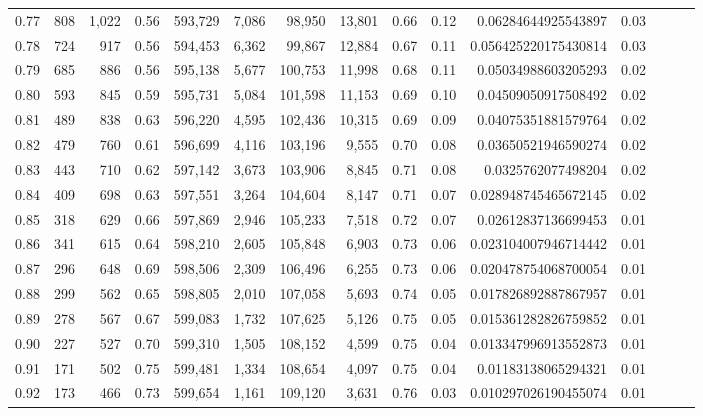 \begin{tabular}{rrrrrrrrrrrrrrr}
0.77 &     808 &  1,022 &  0.56 &  593,729 &    7,086 &   98,950 &   13,801 &  0.66 &  0.12 &    0.06284644925543897 &      0.03 \\
0.78 &     724 &    917 &  0.56 &  594,453 &    6,362 &   99,867 &   12,884 &  0.67 &  0.11 &   0.056425220175430814 &      0.03 \\
0.79 &     685 &    886 &  0.56 &  595,138 &    5,677 &  100,753 &   11,998 &  0.68 &  0.11 &    0.05034988603205293 &      0.02 \\
0.80 &     593 &    845 &  0.59 &  595,731 &    5,084 &  101,598 &   11,153 &  0.69 &  0.10 &    0.04509050917508492 &      0.02 \\
0.81 &     489 &    838 &  0.63 &  596,220 &    4,595 &  102,436 &   10,315 &  0.69 &  0.09 &    0.04075351881579764 &      0.02 \\
0.82 &     479 &    760 &  0.61 &  596,699 &    4,116 &  103,196 &    9,555 &  0.70 &  0.08 &    0.03650521946590274 &      0.02 \\
0.83 &     443 &    710 &  0.62 &  597,142 &    3,673 &  103,906 &    8,845 &  0.71 &  0.08 &     0.0325762077498204 &      0.02 \\
0.84 &     409 &    698 &  0.63 &  597,551 &    3,264 &  104,604 &    8,147 &  0.71 &  0.07 &   0.028948745465672145 &      0.02 \\
0.85 &     318 &    629 &  0.66 &  597,869 &    2,946 &  105,233 &    7,518 &  0.72 &  0.07 &    0.02612837136699453 &      0.01 \\
0.86 &     341 &    615 &  0.64 &  598,210 &    2,605 &  105,848 &    6,903 &  0.73 &  0.06 &   0.023104007946714442 &      0.01 \\
0.87 &     296 &    648 &  0.69 &  598,506 &    2,309 &  106,496 &    6,255 &  0.73 &  0.06 &   0.020478754068700054 &      0.01 \\
0.88 &     299 &    562 &  0.65 &  598,805 &    2,010 &  107,058 &    5,693 &  0.74 &  0.05 &   0.017826892887867957 &      0.01 \\
0.89 &     278 &    567 &  0.67 &  599,083 &    1,732 &  107,625 &    5,126 &  0.75 &  0.05 &   0.015361282826759852 &      0.01 \\
0.90 &     227 &    527 &  0.70 &  599,310 &    1,505 &  108,152 &    4,599 &  0.75 &  0.04 &   0.013347996913552873 &      0.01 \\
0.91 &     171 &    502 &  0.75 &  599,481 &    1,334 &  108,654 &    4,097 &  0.75 &  0.04 &    0.01183138065294321 &      0.01 \\
0.92 &     173 &    466 &  0.73 &  599,654 &    1,161 &  109,120 &    3,631 &  0.76 &  0.03 &   0.010297026190455074 &      0.01 \\

\end{tabular}
